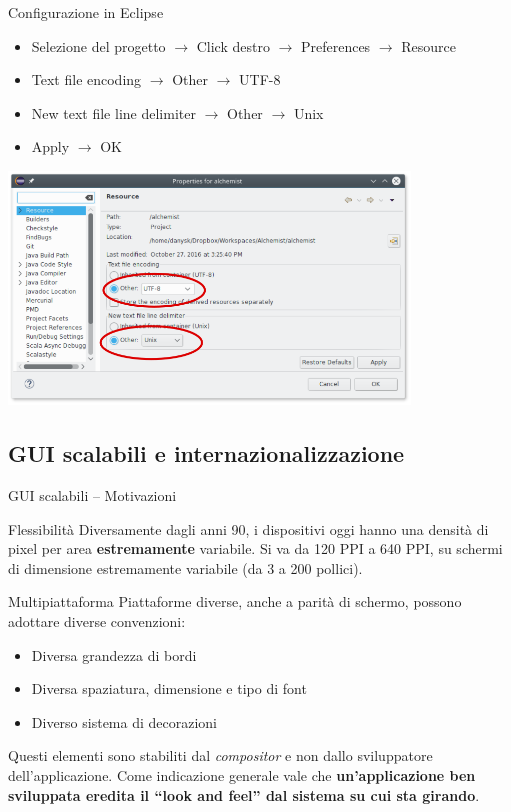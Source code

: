 \documentclass[presentation]{beamer}
\begin{document}
\begin{frame}{Configurazione in Eclipse}
\begin{itemize}
	\item Selezione del progetto $\rightarrow$ Click destro $\rightarrow$ Preferences $\rightarrow$ Resource
	\item Text file encoding $\rightarrow$ Other $\rightarrow$ UTF-8
	\item New text file line delimiter $\rightarrow$ Other $\rightarrow$ Unix
	\item Apply $\rightarrow$ OK
\end{itemize}

\begin{center}
\includegraphics[width=0.8\textwidth]{img/eclipse-encoding}
\end{center}
\end{frame}

\subsection{GUI scalabili e internazionalizzazione}

\begin{frame}{GUI scalabili -- Motivazioni}
\begin{block}{Flessibilità}
Diversamente dagli anni 90, i dispositivi oggi hanno una densità di pixel per area \textbf{estremamente} variabile. Si va da 120 PPI a 640 PPI, su schermi di dimensione estremamente variabile (da 3 a 200 pollici).
\end{block}

\begin{block}{Multipiattaforma}
Piattaforme diverse, anche a parità di schermo, possono adottare diverse convenzioni:
\begin{itemize}
\item Diversa grandezza di bordi
\item Diversa spaziatura, dimensione e tipo di font
\item Diverso sistema di decorazioni
\end{itemize}

Questi elementi sono stabiliti dal \emph{compositor} e non dallo sviluppatore dell'applicazione. Come indicazione generale vale che \textbf{un'applicazione ben sviluppata eredita il ``look and feel'' dal sistema su cui sta girando}.
\end{block}
\end{frame}
\end{document}
